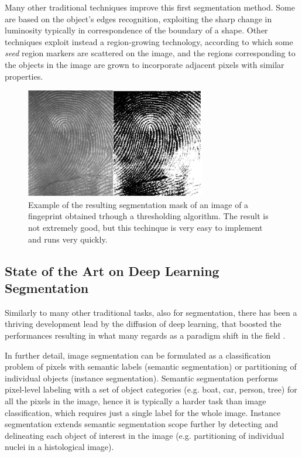 Many other traditional techniques improve this first segmentation method. Some are based on the object's edges recognition, exploiting the sharp change in luminosity typically in correspondence of the boundary of a shape. Other techniques exploit instead a region-growing technology, according to which some \textit{seed} region markers are scattered on the image, and the regions corresponding to the objects in the image are grown to incorporate adjacent pixels with similar properties.

\begin{figure}
    \centering
    \includegraphics[width = 0.7\textwidth]{images/fingerprints}
    \caption{Example of the resulting segmentation mask of an image of a fingeprint obtained trhough a thresholding algorithm. The result is not extremely good, but this techinque is very easy to implement and runs very quickly.}
    \label{fig:fing_prints}
\end{figure}

\subsection{State of the Art on Deep Learning Segmentation}
Similarly to many other traditional tasks, also for segmentation, there has been a thriving development lead by the diffusion of deep learning, that boosted the performances resulting in what many regards as
a paradigm shift in the field \cite{deep_seg_SOA}.

In further detail, image segmentation can be formulated as a classification problem of pixels with semantic labels (semantic segmentation) or partitioning of individual objects (instance segmentation). Semantic segmentation performs pixel-level labeling with a set of object categories (e.g. boat, car, person, tree) for all the pixels in the image, hence it is typically a harder task than image classification, which requires just a single label for the whole image. Instance segmentation extends semantic segmentation scope further by detecting and delineating each object of interest in the image (e.g. partitioning of individual nuclei in a histological image).

